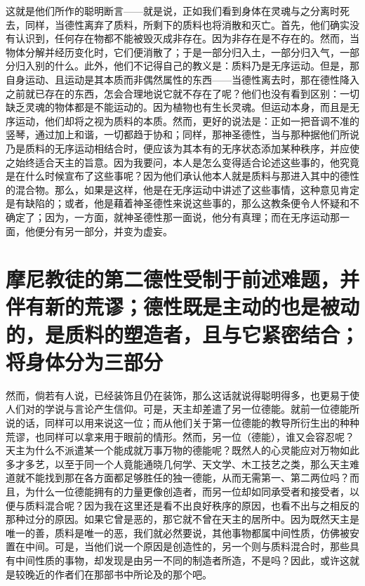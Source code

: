 这就是他们所作的聪明断言——就是说，正如我们看到身体在灵魂与之分离时死去，同样，当德性离弃了质料，所剩下的质料也将消散和灭亡。首先，他们确实没有认识到，任何存在物都不能被毁灭成非存在。因为非存在是不存在的。然而，当物体分解并经历变化时，它们便消散了；于是一部分归入土，一部分归入气，一部分归入别的什么。此外，他们不记得自己的教义是：质料乃是无序运动。但是，那自身运动、且运动是其本质而非偶然属性的东西——当德性离去时，那在德性降入之前就已存在的东西，怎会合理地说它就不存在了呢？他们也没有看到区别：一切缺乏灵魂的物体都是不能运动的。因为植物也有生长灵魂。但运动本身，而且是无序运动，他们却将之视为质料的本质。然而，更好的说法是：正如一把音调不准的竖琴，通过加上和谐，一切都趋于协和；同样，那神圣德性，当与那种据他们所说乃是质料的无序运动相结合时，便应该为其本有的无序状态添加某种秩序，并应使之始终适合天主的旨意。因为我要问，本人是怎么变得适合论述这些事的，他究竟是在什么时候宣布了这些事呢？因为他们承认他本人就是质料与那进入其中的德性的混合物。那么，如果是这样，他是在无序运动中讲述了这些事情，这种意见肯定是有缺陷的；或者，他是藉着神圣德性来说这些事的，那么这教条便令人怀疑和不确定了；因为，一方面，就神圣德性那一面说，他分有真理；而在无序运动那一面，他便分有另一部分，并变为虚妄。\par


\section{摩尼教徒的第二德性受制于前述难题，并伴有新的荒谬；德性既是主动的也是被动的，是质料的塑造者，且与它紧密结合；将身体分为三部分}

然而，倘若有人说，已经装饰且仍在装饰，那么这话就说得聪明得多，也更易于使人们对的学说与言论产生信仰。可是，天主却差遣了另一位德能。就前一位德能所说的话，同样可以用来说这一位；而从他们关于第一位德能的教导所衍生出的种种荒谬，也同样可以拿来用于眼前的情形。然而，另一位（德能），谁又会容忍呢？天主为什么不派遣某一个能成就万事万物的德能呢？既然人的心灵能应对万物如此多才多艺，以至于同一个人竟能通晓几何学、天文学、木工技艺之类，那么天主难道就不能找到那在各方面都足够胜任的独一德能，从而无需第一、第二两位吗？而且，为什么一位德能拥有的力量更像创造者，而另一位却如同承受者和接受者，以便与质料混合呢？因为我在这里还是看不出良好秩序的原因，也看不出与之相反的那种过分的原因。如果它曾是恶的，那它就不曾在天主的居所中。因为既然天主是唯一的善，质料是唯一的恶，我们就必然要说，其他事物都属中间性质，仿佛被安置在中间。可是，当他们说一个原因是创造性的，另一个则与质料混合时，那些具有中间性质的事物，却发现是由另一不同的制造者所造，不是吗？因此，或许这就是较晚近的作者们在那部书中所论及的那个吧。\par

